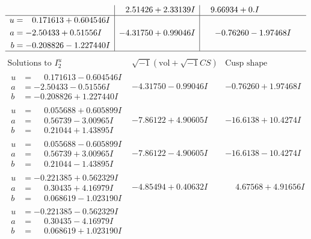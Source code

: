 \documentclass[1p]{elsarticle_modified}
\theoremstyle{definition}
\newcommand{\I}{\sqrt{-1}}
\begin{document}
$$\begin{array}{c|c|c}
 & \phantom{-}2.51426 + 2.33139 I & \phantom{-}9.66934 + 0. I\phantom{ +0.000000I} \\ \hline\begin{aligned}
u &= \phantom{-}0.171613 + 0.604546 I \\
a &= -2.50433 + 0.51556 I \\
b &= -0.208826 - 1.227440 I\end{aligned}
 & -4.31750 + 0.99046 I & -0.76260 - 1.97468 I\\
 \hline 
 \end{array}$$\newpage$$\begin{array}{c|c|c}  
\text{Solutions to }I^u_{2}& \I (\text{vol} + \sqrt{-1}CS) & \text{Cusp shape}\\
 \hline 
\begin{aligned}
u &= \phantom{-}0.171613 - 0.604546 I \\
a &= -2.50433 - 0.51556 I \\
b &= -0.208826 + 1.227440 I\end{aligned}
 & -4.31750 - 0.99046 I & -0.76260 + 1.97468 I \\ \hline\begin{aligned}
u &= \phantom{-}0.055688 + 0.605899 I \\
a &= \phantom{-}0.56739 - 3.00965 I \\
b &= \phantom{-}0.21044 + 1.43895 I\end{aligned}
 & -7.86122 + 4.90605 I & -16.6138 + 10.4274 I \\ \hline\begin{aligned}
u &= \phantom{-}0.055688 - 0.605899 I \\
a &= \phantom{-}0.56739 + 3.00965 I \\
b &= \phantom{-}0.21044 - 1.43895 I\end{aligned}
 & -7.86122 - 4.90605 I & -16.6138 - 10.4274 I \\ \hline\begin{aligned}
u &= -0.221385 + 0.562329 I \\
a &= \phantom{-}0.30435 + 4.16979 I \\
b &= \phantom{-}0.068619 - 1.023190 I\end{aligned}
 & -4.85494 + 0.40632 I & \phantom{-}4.67568 + 4.91656 I \\ \hline\begin{aligned}
u &= -0.221385 - 0.562329 I \\
a &= \phantom{-}0.30435 - 4.16979 I \\
b &= \phantom{-}0.068619 + 1.023190 I\end{aligned}

\end{array}$$
\end{document}

